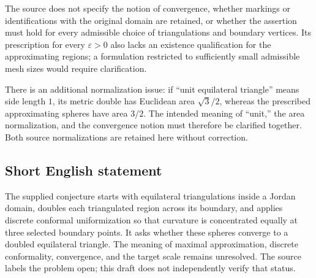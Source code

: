 \documentclass[11pt]{article}
\begin{document}
The source does not specify the notion of convergence, whether markings or identifications with the original domain are retained, or whether the assertion must hold for every admissible choice of triangulations and boundary vertices. Its prescription for every \(\varepsilon>0\) also lacks an existence qualification for the approximating regions; a formulation restricted to sufficiently small admissible mesh sizes would require clarification.

There is an additional normalization issue: if ``unit equilateral triangle'' means side length \(1\), its metric double has Euclidean area \(\sqrt{3}/2\), whereas the prescribed approximating spheres have area \(3/2\). The intended meaning of ``unit,'' the area normalization, and the convergence notion must therefore be clarified together. Both source normalizations are retained here without correction.
\subsection{Short English statement}
The supplied conjecture starts with equilateral triangulations inside a Jordan domain, doubles each triangulated region across its boundary, and applies discrete conformal uniformization so that curvature is concentrated equally at three selected boundary points. It asks whether these spheres converge to a doubled equilateral triangle. The meaning of maximal approximation, discrete conformality, convergence, and the target scale remains unresolved. The source labels the problem open; this draft does not independently verify that status.
\end{document}
